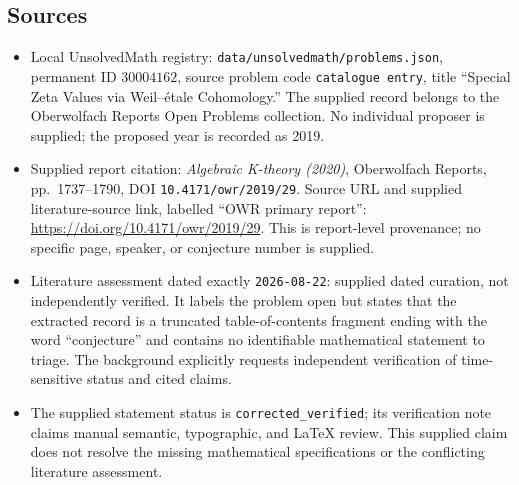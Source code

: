 \documentclass[11pt]{article}
\begin{document}
\subsection{Sources}
\begin{itemize}
\item Local UnsolvedMath registry: \texttt{data/unsolvedmath/problems.json}, permanent ID \(30004162\), source problem code \texttt{catalogue entry}, title ``Special Zeta Values via Weil--\'{e}tale Cohomology.'' The supplied record belongs to the Oberwolfach Reports Open Problems collection. No individual proposer is supplied; the proposed year is recorded as 2019.
\item Supplied report citation: \emph{Algebraic K-theory (2020)}, Oberwolfach Reports, pp.~1737--1790, DOI \texttt{10.4171/owr/2019/29}. Source URL and supplied literature-source link, labelled ``OWR primary report'': \url{https://doi.org/10.4171/owr/2019/29}. This is report-level provenance; no specific page, speaker, or conjecture number is supplied.
\item Literature assessment dated exactly \texttt{2026-08-22}: supplied dated curation, not independently verified. It labels the problem open but states that the extracted record is a truncated table-of-contents fragment ending with the word ``conjecture'' and contains no identifiable mathematical statement to triage. The background explicitly requests independent verification of time-sensitive status and cited claims.
\item The supplied statement status is \texttt{corrected\_verified}; its verification note claims manual semantic, typographic, and LaTeX review. This supplied claim does not resolve the missing mathematical specifications or the conflicting literature assessment.
\end{itemize}
\end{document}

